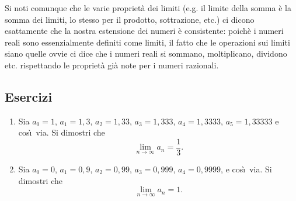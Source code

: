 \documentclass[10pt, twoside]{article}
\numberwithin{equation}{section}
\begin{document}
Si noti comunque che le varie propriet\`a dei limiti (e.g. il limite
della somma \`e la somma dei limiti, lo stesso per il prodotto,
sottrazione, etc.) ci dicono esattamente che la nostra estensione dei
numeri \`e consistente: poich\`e i numeri reali sono essenzialmente
definiti come limiti, il fatto che 
le operazioni sui limiti siano quelle
ovvie ci dice che i numeri reali si sommano, moltiplicano, dividono
etc. rispettando le propriet\`a gi\`a note per i numeri razionali.

\subsection{Esercizi}
\begin{enumerate}
\item Sia $a_0=1$, $a_1=1,3$, $a_2=1,33$, $a_3=1,333$, $a_4=1,3333$,
$a_5=1,33333$ e cos\`\i\ via. Si dimostri che 
\[
\lim_{n\to\infty}a_n=\frac 13.
\]
\item  Sia $a_0=0$, $a_1=0,9$, $a_2=0,99$, $a_3=0,999$, $a_4=0,9999$,
e cos\`\i\ via. Si dimostri che  
\[
\lim_{n\to\infty}a_n=1.
\]
\end{enumerate}
\end{document}
